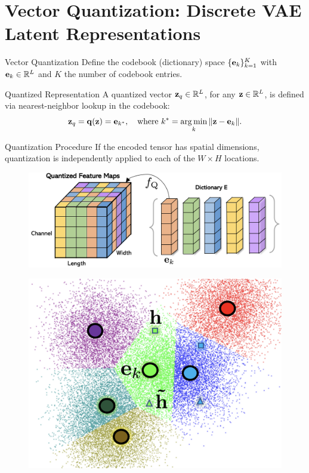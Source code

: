 \documentclass{beamer}
\begin{document}
\section{Vector Quantization: Discrete VAE Latent Representations}
\begin{frame}{Vector Quantization}
	Define the codebook (dictionary) space $\{\mathbf{e}_k\}_{k=1}^K$ with $\mathbf{e}_k \in \mathbb{R}^L$ and $K$ the number of codebook entries.
	\begin{block}{Quantized Representation}
		A quantized vector $\mathbf{z}_q \in \mathbb{R}^{L}$, for any $\mathbf{z} \in \mathbb{R}^L$, is defined via nearest-neighbor lookup in the codebook:
		\vspace{-0.3cm}
		\[
		\mathbf{z}_q = \mathbf{q} (\mathbf{z}) = \mathbf{e}_{k^*}, \quad \text{where } k^* = \operatorname*{arg\,min}_k \| \mathbf{z} - \mathbf{e}_k \|.
		\] 
		\vspace{-0.7cm}
	\end{block}
	\vspace{-0.2cm}
	\begin{block}{Quantization Procedure}
		If the encoded tensor has spatial dimensions, quantization is independently applied to each of the $W \times H$ locations.
		\begin{minipage}[t]{0.65\columnwidth}
			\begin{figure}
				\includegraphics[width=0.8\linewidth]{figs/fqgan_cnn.png}
			\end{figure}
		\end{minipage}%
		\begin{minipage}[t]{0.35\columnwidth}
			\begin{figure}
				\includegraphics[width=0.7\linewidth]{figs/fqgan_lookup}
			\end{figure}
		\end{minipage}
	\end{block}
\end{frame}
\end{document}
